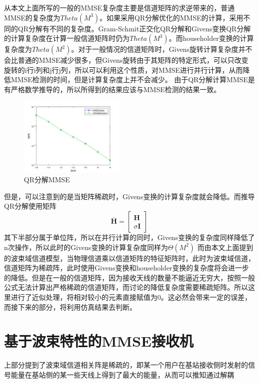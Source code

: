 \documentclass[bachelor,nocolorlinks, printoneside]{seuthesis} %
\begin{document}
\begin{Main}
从本文上面所写的一般的MMSE复杂度主要是信道矩阵的求逆带来的，普通MMSE的复杂度为$Theta(M^3)$。如果采用QR分解优化的MMSE的计算，采用不同的QR分解有不同的复杂度。Gram-Schmit正交化QR分解和Givens变换QR分解的计算复杂度在计算一般信道矩阵时仍为$Theta(M^3)$。而householder变换的计算复杂度为$Theta(M^2)$。对于一般情况的信道矩阵时，Givens旋转计算复杂度并不会比普通的MMSE减少很多，但Givens旋转由于其矩阵的特定形式，可以只改变旋转的i行i列和j行j列，所以可以利用这个性质，对MMSE进行并行计算，从而降低MMSE检测的时间，但是计算复杂度上并不会减少。
由于QR分解计算MMSE是有严格数学推导的，所以所得到的结果应该与MMSE检测的结果一致。
\begin{figure}[htbp!]
	\centering \includegraphics[width=0.45\textwidth]{img/3_9.jpg} \caption{QR分解MMSE}
\end{figure}

但是，可以注意到的是当矩阵稀疏时，Givens变换的计算复杂度就会降低。而推导QR分解使用矩阵
\begin{equation}\label{key}
\overline{\mathbf{H}} = \left[
\begin{array}{c}
\mathbf{H}\\
\sigma \mathbf{I}
\end{array} \right]
\end{equation}
其下半部分属于单位阵，所以在并行计算的同时，Givens变换的复杂度同样降低了n次操作，所以此时的Givens变换的计算复杂度同样为$\Theta(M^2)$
而由本文上面提到的波束域信道模型，当物理信道乘以信道矩阵的特征矩阵时，此时为波束域信道，信道矩阵为稀疏阵，此时使用Givens变换和householder变换的复杂度将会进一步的降低。但是在一般的信道矩阵，因为接收天线的数量不能逼近无穷大，按照一般公式无法计算出严格稀疏的信道矩阵，而讨论的降低复杂度需要稀疏矩阵。所以这里进行了近似处理，将相对较小的元素直接赋值为0。这必然会带来一定的误差，而接下来的部分，将利用仿真结果去判断。

\section{基于波束特性的MMSE接收机}
上部分提到了波束域信道相关阵是稀疏的，即某一个用户在基站接收侧时发射的信号能量在基站侧的某一些天线上得到了最大的能量，从而可以推知通过解耦




\end{Main}
\end{document}
